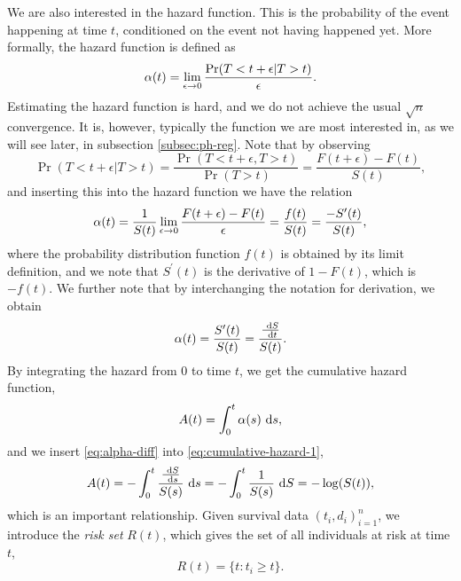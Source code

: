 We are also interested in the hazard function. This is the probability of the event happening at time $t$, conditioned on the event not having happened yet. More formally, the hazard function is defined as
\begin{equation*}
    \alpha(t)=\lim_{\epsilon\to0}\frac{\Pr(T<t+\epsilon|T>t)}{\epsilon}.
\end{equation*}
Estimating the hazard function is hard, and we do not achieve the usual $\sqrt{n}$ convergence.
It is, however, typically the function we are most interested in, as we will see later, in subsection \ref{subsec:ph-reg}.
Note that by observing
\begin{equation*}
    \Pr(T<t+\epsilon|T>t)=\frac{\Pr(T<t+\epsilon,T>t)}{\Pr(T>t)}=\frac{F(t+\epsilon)-F(t)}{S(t)},
\end{equation*}
and inserting this into the hazard function we have the relation
\begin{equation}
\label{eq:hfs}
    \alpha(t)=\frac{1}{S(t)}\lim_{\epsilon\to0}\frac{F(t+\epsilon)-F(t)}{\epsilon}=\frac{f(t)}{S(t)}=\frac{-S^\prime(t)}{S(t)},
\end{equation}
where the probability distribution function $f(t)$ is obtained by its limit definition, and we note that $S^\prime(t)$ is the derivative of $1-F(t)$, which is $-f(t)$. We further note that by interchanging the notation for derivation, we obtain
\begin{equation}\label{eq:alpha-diff}
\alpha(t)=\frac{S^{\prime}(t)}{S(t)}=\frac{\frac{~\text{d} S}{~\text{d} t}}{S(t)}.
\end{equation}
By integrating the hazard from 0 to time $t$, we get the cumulative hazard function,
\begin{equation}\label{eq:cumulative-hazard-1}
    A(t)=\int_0^t\alpha(s)~\text{d} s,
\end{equation}
and we insert \eqref{eq:alpha-diff} into \eqref{eq:cumulative-hazard-1},
\begin{equation}\label{eq:cumulative-hazard}
\begin{split}
     A(t)=-\int_0^t\frac{\frac{~\text{d} S}{~\text{d} s}}{S(s)}~\text{d} s=-\int_0^t\frac{1}{S(s)}~\text{d} S=-\log(S(t)),
\end{split}
\end{equation}
which is an important relationship.
Given survival data $(t_i,d_i)_{i=1}^n$, we introduce the \textit{risk set} $R(t)$, which gives the set of all individuals at risk at time $t$,
\begin{equation*}
    R(t)=\{t\colon t_i\geq t\}.
\end{equation*}
